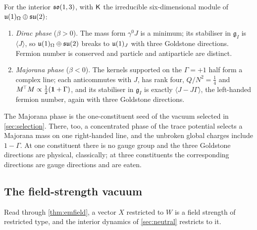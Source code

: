 \begin{theorem}
\label{thm:twophases}
For the interior $\mathfrak{so}(1,3)$, with $\mathsf K$ the irreducible six-dimensional module of $\mathfrak{u}(1)_\Omega\oplus\mathfrak{su}(2)$:
\begin{enumerate}[label=(\alph*),leftmargin=2.2em]
\item \emph{Dirac phase} ($\beta>0$). The mass form $\gamma^0J$ is a minimum; its stabiliser in $\mathfrak g_I$ is $\langle J\rangle$, so
$\mathfrak{u}(1)_\Omega\oplus\mathfrak{su}(2)$ breaks to $\mathfrak{u}(1)_J$ with three Goldstone directions. Fermion number is conserved and particle and antiparticle are
distinct.
\item \emph{Majorana phase} ($\beta<0$). The kernels supported on the $\Gamma=+1$ half form a complex line; each anticommutes with $J$, has
rank four, $Q/N^2=\tfrac14$ and $M^{\!\top}M\propto\tfrac12(\mathbf 1+\Gamma)$, and its stabiliser in $\mathfrak g_I$ is exactly $\langle J-J\Gamma\rangle$,
the left-handed fermion number, again with three Goldstone directions.
\end{enumerate}
\end{theorem}

The Majorana phase is the one-constituent seed of the vacuum selected in \cref{sec:selection}. There, too, a concentrated phase of the
trace potential selects a Majorana mass on one right-handed line, and the unbroken global charges include $1-\Gamma$. At one constituent there
is no gauge group and the three Goldstone directions are physical, classically; at three constituents the corresponding directions are gauge
directions and are eaten.

\subsection{The field-strength vacuum}

Read through \cref{thm:emfield}, a vector $X$ restricted to $W$ is a field strength of restricted type, and the interior dynamics of
\cref{sec:neutral} restricts to it.

